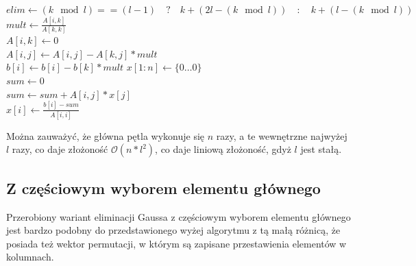 \documentclass{article}
\begin{document}
\begin{algorithm}[H]
    \DontPrintSemicolon
    \;
     {
        $elim \gets (k \mod l) == (l - 1)\quad ? \quad k + (2l - (k \mod l)) \quad : \quad k + (l - (k \mod l))$ \\
         {
            $mult \gets \frac{A[i,k]}{A[k,k]}$ \\
            $A[i,k] \gets 0$\\
             {
                $A[i,j] \gets A[i,j] - A[k,j] * mult$\\
            }
            $b[i] \gets b[i] - b[k] * mult$
        }
    }
    $x[1:n] \gets \{0 \ldots 0\}$\\
     {
        $sum \gets 0$\\
         {
            $sum \gets sum + A[i,j] * x[j]$\\
        }
        $x[i] \gets \frac{b[i] - sum}{A[i,i]}$\\
    }
    \;
\end{algorithm}
\quad
\newline
\newline
 Można zauważyć, że główna pętla wykonuje się $n$ razy, a te wewnętrzne 
 najwyżej $l$ razy, co daje złożoność $\mathcal{O}(n*l^2)$, co daje 
 liniową złożoność, gdyż $l$ jest stałą.

\subsection{Z częściowym wyborem elementu głównego}
Przerobiony wariant eliminacji Gaussa z częściowym wyborem elementu 
głównego jest bardzo podobny do przedstawionego wyżej algorytmu z tą małą 
różnicą, że posiada też wektor permutacji, w którym są zapisane przestawienia 
elementów w kolumnach.
\end{document}
